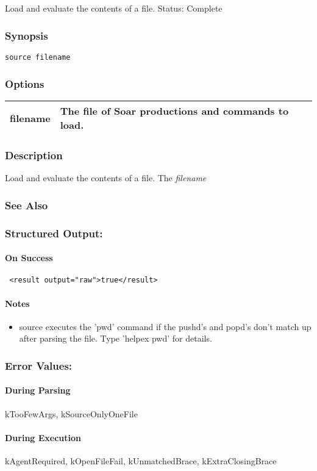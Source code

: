 \subsection{}
\label{source}
Load and evaluate the contents of a file. 
 Status: Complete
\subsubsection*{Synopsis}
\begin{verbatim}
source filename
\end{verbatim}
\subsubsection*{Options}
\begin{tabular}{|l|l|}
\hline 
filename & The file of Soar productions and commands to load.  \\
 \hline 
\end{tabular}
\subsubsection*{Description}
 Load and evaluate the contents of a file. The \emph{filename}
\subsubsection*{See Also}
\subsubsection*{Structured Output:}
\paragraph*{On Success}
\begin{verbatim}
 <result output="raw">true</result>
\end{verbatim}
\paragraph*{Notes}
\begin{itemize}
\item  source executes the 'pwd' command if the pushd's and popd's don't match up after parsing the file. Type 'helpex pwd' for details. 
\end{itemize}
\subsubsection*{Error Values:}
\paragraph*{During Parsing}
 kTooFewArgs, kSourceOnlyOneFile
\paragraph*{During Execution}
 kAgentRequired, kOpenFileFail, kUnmatchedBrace, kExtraClosingBrace

